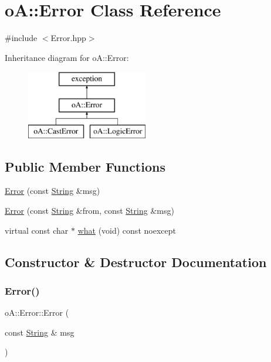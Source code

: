 \hypertarget{classo_a_1_1_error}{}\section{oA\+:\+:Error Class Reference}
\label{classo_a_1_1_error}


{\ttfamily \#include $<$Error.\+hpp$>$}

Inheritance diagram for oA\+:\+:Error\+:\begin{figure}[H]
\begin{center}
\leavevmode
\includegraphics[height=3.000000cm]{classo_a_1_1_error}
\end{center}
\end{figure}
\subsection*{Public Member Functions}
\begin{DoxyCompactItemize}
\item 
\mbox{\hyperlink{classo_a_1_1_error_a16d10704561d2b756722d71d8703089c}{Error}} (const \mbox{\hyperlink{classo_a_1_1_string}{String}} \&msg)
\item 
\mbox{\hyperlink{classo_a_1_1_error_adf66492ca8b03fa14d09e5bba7cdacbd}{Error}} (const \mbox{\hyperlink{classo_a_1_1_string}{String}} \&from, const \mbox{\hyperlink{classo_a_1_1_string}{String}} \&msg)
\item 
virtual const char $\ast$ \mbox{\hyperlink{classo_a_1_1_error_aaef80480c87b91b1a34853c791b649ef}{what}} (void) const noexcept
\end{DoxyCompactItemize}


\subsection{Constructor \& Destructor Documentation}
\mbox{\label{classo_a_1_1_error_a16d10704561d2b756722d71d8703089c}} 
\subsubsection{\texorpdfstring{Error()}{Error()}\hspace{0.1cm}{\footnotesize\ttfamily [1/2]}}
{\footnotesize\ttfamily o\+A\+::\+Error\+::\+Error (\begin{DoxyParamCaption}\item[{const \mbox{\hyperlink{classo_a_1_1_string}{String}} \&}]{msg }\end{DoxyParamCaption})\hspace{0.3cm}{\ttfamily [inline]}}

